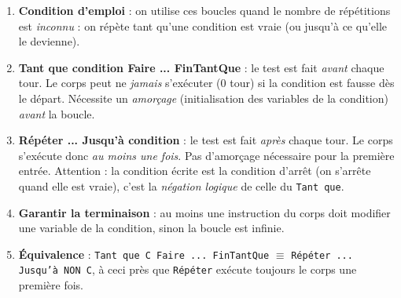 \documentclass[11pt]{article}
\newcommand{\cle}[1]{{\popxbold\color{popdark}#1}}
\begin{document}
\begin{methode}
\begin{enumerate}
\item \textbf{Condition d'emploi} : on utilise ces boucles quand le nombre de répétitions est \emph{inconnu} : on répète tant qu'une condition est vraie (ou jusqu'à ce qu'elle le devienne).
\item \textbf{Tant que condition Faire ... FinTantQue} : le test est fait \emph{avant} chaque tour. Le corps peut ne \emph{jamais} s'exécuter (0 tour) si la condition est fausse dès le départ. Nécessite un \emph{amorçage} (initialisation des variables de la condition) \emph{avant} la boucle.
\item \textbf{Répéter ... Jusqu'à condition} : le test est fait \emph{après} chaque tour. Le corps s'exécute donc \emph{au moins une fois}. Pas d'amorçage nécessaire pour la première entrée. Attention : la condition écrite est la \cle{condition d'arrêt} (on s'arrête quand elle est vraie), c'est la \emph{négation logique} de celle du \texttt{Tant que}.
\item \textbf{Garantir la terminaison} : au moins une instruction du corps doit modifier une variable de la condition, sinon la boucle est infinie.
\item \textbf{Équivalence} : \texttt{Tant que C Faire ... FinTantQue} $\equiv$ \texttt{Répéter ... Jusqu'à NON C}, à ceci près que \texttt{Répéter} exécute toujours le corps une première fois.
\end{enumerate}
\end{methode}
\end{document}
